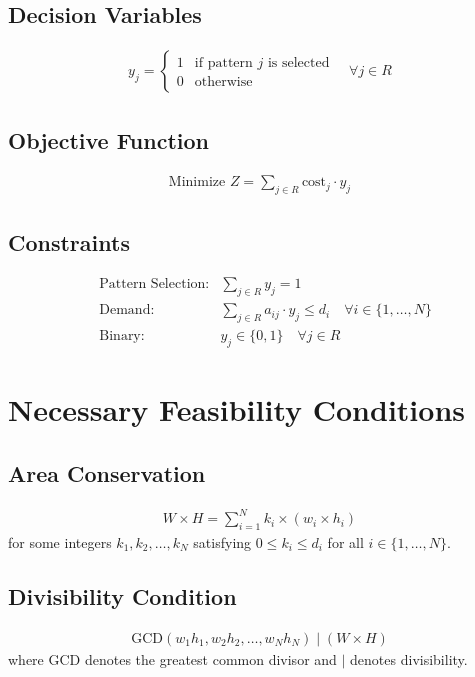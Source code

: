 \documentclass{article}
\begin{document}
\subsection{Decision Variables}
\begin{align*}
y_j = 
\begin{cases}
1 & \text{if pattern } j \text{ is selected} \\
0 & \text{otherwise}
\end{cases}
\quad \forall j \in R
\end{align*}

\subsection{Objective Function}
\begin{align*}
\text{Minimize } Z = \sum_{j \in R} \text{cost}_j \cdot y_j
\end{align*}

\subsection{Constraints}
\begin{align}
&\text{Pattern Selection:} & \sum_{j \in R} y_j = 1 \\
&\text{Demand:} & \sum_{j \in R} a_{ij} \cdot y_j \leq d_i \quad \forall i \in \{1, \ldots, N\} \\
&\text{Binary:} & y_j \in \{0,1\} \quad \forall j \in R
\end{align}

\section{Necessary Feasibility Conditions}

\subsection{Area Conservation}
\begin{align}
W \times H = \sum_{i=1}^{N} k_i \times (w_i \times h_i)
\end{align}
for some integers $k_1, k_2, \ldots, k_N$ satisfying $0 \leq k_i \leq d_i$ for all $i \in \{1, \ldots, N\}$.

\subsection{Divisibility Condition}
\begin{align}
\text{GCD}(w_1h_1, w_2h_2, \ldots, w_Nh_N) \mid (W \times H)
\end{align}
where $\text{GCD}$ denotes the greatest common divisor and $\mid$ denotes divisibility.
\end{document}
